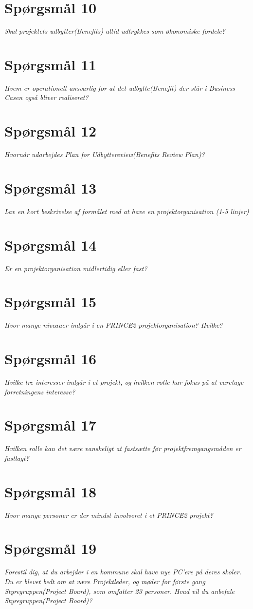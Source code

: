 \section{Spørgsmål 10}
\textit{Skal projektets udbytter(Benefits) altid udtrykkes som økonomiske fordele?}
\section{Spørgsmål 11}
\textit{Hvem er operationelt ansvarlig for at det udbytte(Benefit) der står i Business Casen også bliver realiseret?}
\section{Spørgsmål 12}
\textit{Hvornår udarbejdes Plan for Udbyttereview(Benefits Review Plan)?}
\section{Spørgsmål 13}
\textit{Lav en kort beskrivelse af formålet med at have en projektorganisation (1-5 linjer)}
\section{Spørgsmål 14}
\textit{Er en projektorganisation midlertidig eller fast?}
\section{Spørgsmål 15}
\textit{Hvor mange niveauer indgår i en PRINCE2 projektorganisation? Hvilke?}
\section{Spørgsmål 16}
\textit{Hvilke tre interesser indgår i et projekt, og hvilken rolle har fokus på at varetage forretningens interesse?}
\section{Spørgsmål 17}
\textit{Hvilken rolle kan det være vanskeligt at fastsætte før projektfremgangsmåden er fastlagt?}
\section{Spørgsmål 18}
\textit{Hvor mange personer er der mindst involveret i et PRINCE2 projekt?}
\section{Spørgsmål 19}
\textit{Forestil dig, at du arbejder i en kommune skal have nye PC’ere på deres skoler. Du er blevet bedt om at være Projektleder, og møder for første gang Styregruppen(Project Board), som omfatter 23 personer. Hvad vil du anbefale Styregruppen(Project Board)?}
